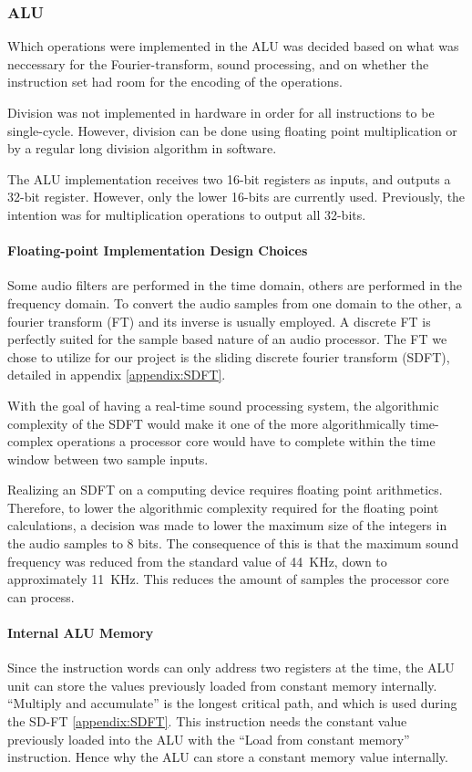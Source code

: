 \FloatBarrier
\subsubsection{ALU}\label{subsec:fpga-alu}

Which operations were implemented in the ALU was decided based on what
was neccessary for the Fourier-transform, sound processing, and on whether the
instruction set had room for the encoding of the operations.

Division was not implemented in hardware in order for all instructions to be
single-cycle. However, division can be done using floating point multiplication
or by a regular long division algorithm in software.

The ALU implementation receives two 16-bit registers as inputs, and outputs a
32-bit register. However, only the lower 16-bits are currently used. Previously,
the intention was for multiplication operations to output all 32-bits.

\paragraph{Floating-point Implementation Design Choices}

Some audio filters are performed in the time domain, others are performed in the
frequency domain. To convert the audio samples from one domain to the other, a
fourier transform (FT) and its inverse is usually employed. A discrete FT is
perfectly suited for the sample based nature of an audio processor. The FT we
chose to utilize for our project is the
sliding discrete fourier transform (SDFT), detailed in appendix \ref{appendix:SDFT}.

With the goal of having a real-time sound processing system, the algorithmic
complexity of the SDFT would make it one of the more algorithmically
time-complex operations a processor core would have to complete within the
time window between two sample inputs.

Realizing an SDFT on a computing device requires floating point arithmetics.
Therefore, to lower the algorithmic complexity required for the floating point
calculations, a decision was made to lower the maximum size of the integers in
the audio samples to 8 bits. The consequence of this is that the maximum sound
frequency was reduced from the standard value of 44~KHz, down to approximately 11~KHz.
This reduces the amount of samples the processor core can process.

\paragraph{Internal ALU Memory}

Since the instruction words can only address two registers at the time, the ALU
unit can store the values previously loaded from constant memory internally.
``Multiply and accumulate'' is the longest critical path, and which is used
during the SD-FT \ref{appendix:SDFT}. This instruction needs the constant value
previously loaded into the ALU with the ``Load from constant memory''
instruction. Hence why the ALU can store a constant memory value internally.
